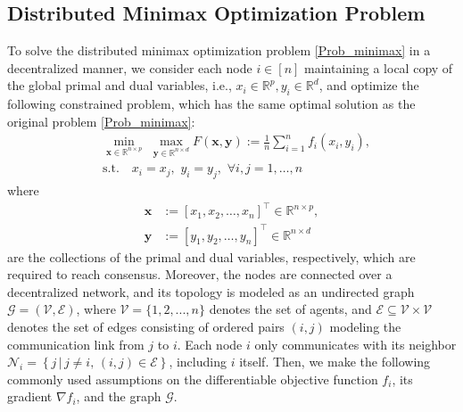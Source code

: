 \documentclass[letterpaper, 10 pt, conference]{ieeeconf}
\begin{document}
\subsection{Distributed Minimax Optimization Problem}
To solve the distributed minimax optimization problem \eqref{Prob_minimax} in a decentralized manner, we consider each node $i\in[n]$ maintaining a local copy of the global primal and dual variables, i.e., $x_i\in \mathbb{R} ^p, y_i\in \mathbb{R} ^d$, and optimize the following constrained problem, which has the same optimal solution as the original problem \eqref{Prob_minimax}: 
\begin{equation}\label{Prob_minimax_constained}
\begin{aligned}
&\underset{\mathbf{x}\in \mathbb{R} ^{n\times p}}{\min}\,\,\underset{\mathbf{y}\in \mathbb{R} ^{n\times d}}{\max}F\left( \mathbf{x},\mathbf{y} \right) :=\frac{1}{n}\sum_{i=1}^n{f_i\left( x_i,y_i \right) ,}
\\
&\text{s.t.} \quad x_i=x_j,\,\, y_i=y_j, \,\, \forall i, j=1,\dots ,n
\end{aligned}
\end{equation}
where 
\begin{equation*}
\begin{aligned}
\mathbf{x}&:=\left[ x_1,x_2,\dots ,x_n \right] ^{\top}\in \mathbb{R} ^{n\times p},
\\
\mathbf{y}&:=\left[ y_1,y_2,\dots ,y_n \right] ^{\top}\in \mathbb{R} ^{n\times d}
\end{aligned}
\end{equation*}
are the collections of the primal and dual variables, respectively, which are required to reach consensus.
Moreover, the nodes are connected over a decentralized network, and its topology is modeled as an undirected graph $\mathcal{G}=(\mathcal{V},\mathcal{E})$, where $\mathcal{V}=\{1,2,...,n\}$ denotes the set of agents, and $\mathcal{E}\subseteq\mathcal{V}\times \mathcal{V}$ denotes the set of edges consisting of ordered pairs $(i,j)$ modeling the communication link from $j$ to $i$. Each node $i$ only communicates with its neighbor $\mathcal{N}_i=\left\{ j\,|\,j\ne i,\, \left( i, j \right) \in \mathcal{E} \right\} $, including $i$ itself.
Then, we make the following commonly used assumptions on the differentiable objective function $f_i$, its gradient $\nabla f_i$, and the graph $\mathcal{G}$.
\end{document}
